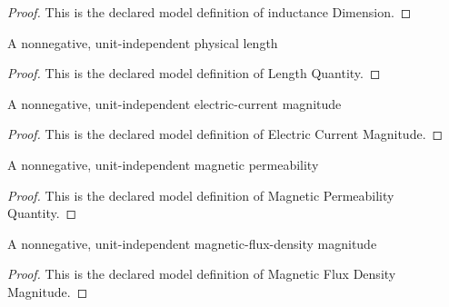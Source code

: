 \begin{proof}
  This is the declared model definition of inductance Dimension.
\end{proof}
\begin{definition}
  \label{def:physics:phyx-mini-0940:phyxminiproblems-problemphyxmini0940-lengthquantity}
  A nonnegative, unit-independent physical length
\end{definition}
\begin{proof}
  This is the declared model definition of Length Quantity.
\end{proof}
\begin{definition}
  \label{def:physics:phyx-mini-0940:phyxminiproblems-problemphyxmini0940-electriccurrentmagnitude}
  A nonnegative, unit-independent electric-current magnitude
\end{definition}
\begin{proof}
  This is the declared model definition of Electric Current Magnitude.
\end{proof}
\begin{definition}
  \label{def:physics:phyx-mini-0940:phyxminiproblems-problemphyxmini0940-magneticpermeabilityquantity}
  A nonnegative, unit-independent magnetic permeability
\end{definition}
\begin{proof}
  This is the declared model definition of Magnetic Permeability Quantity.
\end{proof}
\begin{definition}
  \label{def:physics:phyx-mini-0940:phyxminiproblems-problemphyxmini0940-magneticfluxdensitymagnitude}
  A nonnegative, unit-independent magnetic-flux-density magnitude
\end{definition}
\begin{proof}
  This is the declared model definition of Magnetic Flux Density Magnitude.
\end{proof}
